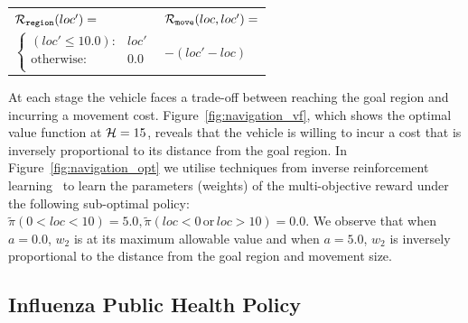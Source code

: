 {\footnotesize 
    \abovedisplayskip=10pt
    \belowdisplayskip=0pt
    \renewcommand{\arraystretch}{1.5}
    \begin{tabular}{ll}    
        $ \mathcal{R}_{\mathtt{region}}(loc') = $ &  $ \mathcal{R}_{\mathtt{move}}(loc, loc') =  $ \\
        \qquad $ \begin{cases}
        (loc' \leq 10.0 ) : 				& loc' \\
        \text{otherwise} : 					& 0.0 \\
        \end{cases} $ 						& \qquad $ - (loc' - loc)  $\\
    \end{tabular}
} 

At each stage the vehicle faces a trade-off between reaching the goal region and incurring a movement cost. Figure~\ref{fig:navigation_vf}, which shows the optimal value function at {\footnotesize$ \mathcal{H} = 15 $}, 
reveals that the vehicle is willing to incur a cost that is inversely proportional to its distance from the goal region. In Figure~\ref{fig:navigation_opt} we utilise techniques from inverse reinforcement learning~\cite{Ng_ICML_2000} to learn the parameters (weights) of the multi-objective reward under the following sub-optimal policy: {\footnotesize $ \tilde{\pi}(0 < loc < 10) = 5.0,  \tilde{\pi}(loc < 0 \,\mathrm{or}\, loc > 10) = 0.0$}. We observe that when {\footnotesize $a = 0.0$}, {\footnotesize $ w_2 $} is at its maximum allowable value and when {\footnotesize $a = 5.0$}, {\footnotesize $ w_2 $} is inversely proportional to the distance from the goal region and movement size.

\subsection{Influenza Public Health Policy}
\label{sec:results_influenza}

